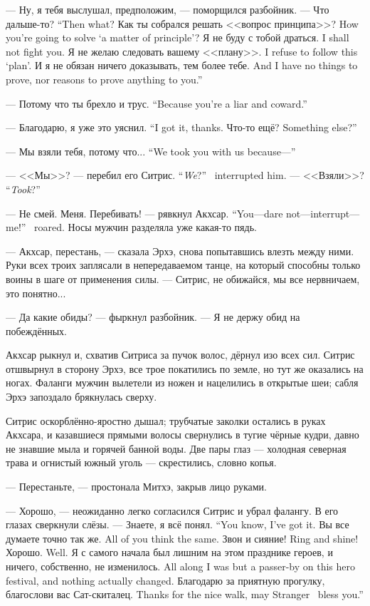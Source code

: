 --- Ну, я тебя выслушал, предположим, --- поморщился разбойник.
{--- Что дальше-то?}
{``Then what?}
{Как ты собрался решать <<вопрос принципа>>?}
{How you're going to solve `a matter of principle'?}
{Я не буду с тобой драться.}
{I shall not fight you.}
{Я не желаю следовать вашему <<плану>>.}
{I refuse to follow this `plan'.}
{И я не обязан ничего доказывать, тем более тебе.}
{And I have no things to prove, nor reasons to prove anything to you.''}

{--- Потому что ты брехло и трус.}
{``Because you're a liar and coward.''}

{--- Благодарю, я уже это уяснил.}
{``I got it, thanks.}
{Что-то ещё?}
{Something else?''}

{--- Мы взяли тебя, потому что...}
{``We took you with us because---''}

{--- <<Мы>>? --- перебил его Ситрис.}
{``\emph{We}?'' \Sitris\ interrupted him.}
{--- <<Взяли>>?}
{``\emph{Took}?''}

{--- Не смей. Меня. Перебивать! --- рявкнул Акхсар.}
{``You---dare not---interrupt---me!'' \Akchsar\ roared.}
Носы мужчин разделяла уже какая-то пядь.

--- Акхсар, перестань, --- сказала Эрхэ, снова попытавшись влезть между ними.
Руки всех троих заплясали в непередаваемом танце, на который способны только воины в шаге от применения силы.
--- Ситрис, не обижайся, мы все нервничаем, это понятно...

--- Да какие обиды? --- фыркнул разбойник.
--- Я не держу обид на побеждённых.

Акхсар рыкнул и, схватив Ситриса за пучок волос, дёрнул изо всех сил.
Ситрис отшвырнул в сторону Эрхэ, все трое покатились по земле, но тут же оказались на ногах.
Фаланги мужчин вылетели из ножен и нацелились в открытые шеи;
сабля Эрхэ запоздало брякнулась сверху.

Ситрис оскорблённо-яростно дышал;
трубчатые заколки остались в руках Акхсара, и казавшиеся прямыми волосы свернулись в тугие чёрные кудри, давно не знавшие мыла и горячей банной воды.
Две пары глаз --- холодная северная трава и огнистый южный уголь --- скрестились, словно копья.

--- Перестаньте, --- простонала Митхэ, закрыв лицо руками.

--- Хорошо, --- неожиданно легко согласился Ситрис и убрал фалангу.
В его глазах сверкнули слёзы.
{--- Знаете, я всё понял.}
{``You know, I've got it.}
{Вы все думаете точно так же.}
{All of you think the same.}
{Звон и сияние!}
{Ring and shine!}
{Хорошо.}
{Well.}
{Я с самого начала был лишним на этом празднике героев, и ничего, собственно, не изменилось.}
{All along I was but a passer-by on this hero festival, and nothing actually changed.}
{Благодарю за приятную прогулку, благослови вас Сат-скиталец.}
{Thanks for the nice walk, may Stranger \Sat\ bless you.''}

